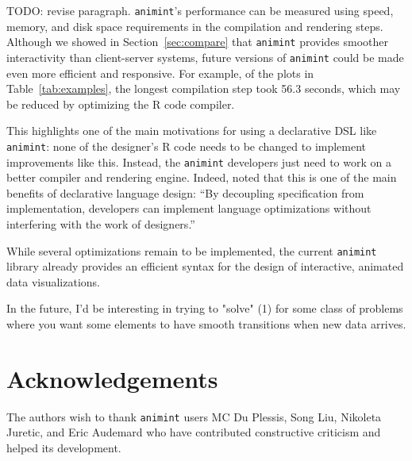 \documentclass[journal]{vgtc}\usepackage[]{graphicx}\usepackage[]{color}
\begin{document}
TODO: revise paragraph. \texttt{animint}'s performance can be measured using
speed, memory, and disk space requirements in the compilation and
rendering steps. Although we showed in Section~\ref{sec:compare} that
\texttt{animint} provides smoother interactivity than client-server systems,
future versions of \texttt{animint} could be made even more efficient and
responsive. For example, of the plots in Table~\ref{tab:examples}, the
longest compilation step took 56.3 seconds, which may be reduced by
optimizing the R code compiler.

This highlights one of the main motivations for using a declarative
DSL like \texttt{animint}: none of the designer's R code needs to be changed to
implement improvements like this. Instead, the \texttt{animint} developers just
need to work on a better compiler and rendering engine. Indeed,
\citet{declarative} noted that this is one of the main benefits of
declarative language design: ``By decoupling specification from
implementation, developers can implement language optimizations
without interfering with the work of designers.''

While several
optimizations remain to be implemented, the current \texttt{animint} library
already provides an efficient syntax for the design of interactive,
animated data visualizations.

In the future, I'd be interesting in trying to "solve" (1) for some
class of problems where you want some elements to have smooth
transitions when new data arrives.

\section*{Acknowledgements}

The authors wish to thank \texttt{animint} users MC Du Plessis, Song Liu,
Nikoleta Juretic, and Eric Audemard
who have contributed constructive criticism and helped its development.

%



\end{document}
